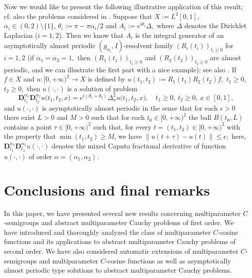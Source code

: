 \documentclass{amsart}
\theoremstyle{definition}
\theoremstyle{remark}
\numberwithin{equation}{section}
\begin{document}
Now we would like to present the following illustrative application of this result; cf. also the problems considered in \cite[Subsection
8.1.6]{apsclcs}. 
Suppose that $X:= L^{2}[0, 1]$, $\alpha_{i} \in  (0,2) \setminus \{1\}$, $\theta_{i}:=\pi -\pi \alpha_{i}/2$ and
$A_{i} := e^{i\theta_{i}}\Delta,$ where $\Delta$ denotes the Dirichlet Laplacian ($i=1,2$). Then we know that  $A_{i}$
is the integral generator of an asymptotically almost periodic $(g_{\alpha_{i}},I)$-resolvent family $(R_{i}(t_{i}))_{t_{i}\geq 0}$ for $i=1,2$ (if $\alpha_{1}=\alpha_{2}=1,$ then $(R_{1}(t_{1}))_{t_{1}\geq 0}$ and $(R_{2}(t_{2}))_{t_{2}\geq 0}$ are almost periodic, and we can illustrate the first part with a nice example); see also \cite[Subsection 8.1.3]{apsclcs}.
If $f\in X$ and $u : [0,+\infty)^{2}\rightarrow X$ is defined by $u(t_{1},t_{2}):=R_{1}(t_{1})R_{2}(t_{2})f,$ $t_{1}\geq 0,$ $t_{2}\geq 0,$ then $u(\cdot,\cdot)$ is a solution of problem
$$
{\mathbf D}_{t_{1}}^{\alpha_{1}}{\mathbf D}_{t_{2}}^{\alpha_{2}}u\bigl(t_{1},t_{2},x\bigr)= e^{i(\theta_{1}+\theta_{2})}\Delta^{2}_{x} u\bigl(t_{1},t_{2},x\bigr),\quad t_{1}\geq 0,\ t_{2}\geq 0,\ x\in [0,1],
$$
and $u(\cdot,\cdot)$ is asymptotically almost periodic in the sense that for each $\epsilon>0$ there exist $L>0$ and $M>0$ such that for each $t_{0}\in [0,+\infty)^{2}$ the ball $B(t_{0},L)$ contains a point $\tau \in  [0,+\infty)^{2}$ such that, for every $t=(t_{1},t_{2})\in [0,+\infty)^{2}$ with the property that $\min(t_{1},t_{2})\geq M$, we have $\|u(t+\tau)-u(t)\| \leq \epsilon;$ here, ${\mathbf D}_{t_{1}}^{\alpha_{1}}{\mathbf D}_{t_{2}}^{\alpha_{2}}u(\cdot,\cdot)$ denotes the mixed Caputo fractional derivative of function
$u(\cdot,\cdot)$ of order $\alpha=(\alpha_{1},\alpha_{2}).$

\section{Conclusions and final remarks}\label{moze}

In this paper, we have presented several new results concerning multiparameter $C$-semigroups and abstract multiparameter Cauchy problems of first order. We have introduced and thoroughly analyzed the class of multiparameter $C$-cosine functions and its applications to abstract multiparameter Cauchy problems of second order. We have also considered automatic extensions of multiparameter $C$-semigroups and multiparameter $C$-cosine functions as well as asymptotically almost periodic type solutions to abstract multiparameter Cauchy problems. 
\end{document}
